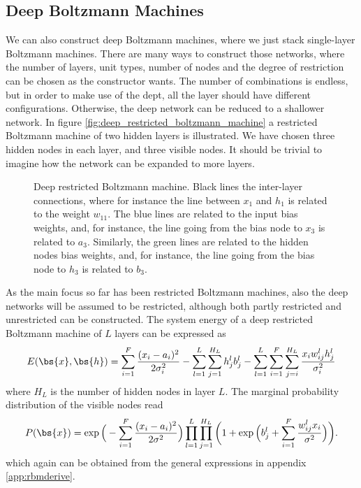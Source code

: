 \subsection{Deep Boltzmann Machines}
We can also construct deep Boltzmann machines, where we just stack single-layer Boltzmann machines. There are many ways to construct those networks, where the number of layers, unit types, number of nodes and the degree of restriction can be chosen as the constructor wants. The number of combinations is endless, but in order to make use of the dept, all the layer should have different configurations. Otherwise, the deep network can be reduced to a shallower network. In figure \eqref{fig:deep_restricted_boltzmann_machine} a restricted Boltzmann machine of two hidden layers is illustrated. We have chosen three hidden nodes in each layer, and three visible nodes. It should be trivial to imagine how the network can be expanded to more layers. 
\begin{figure} [H]
	\centering
	
	\caption{Deep restricted Boltzmann machine. Black lines the inter-layer connections, where for instance the line between $x_1$ and $h_1$ is related to the weight $w_{11}$. The blue lines are related to the input bias weights, and, for instance, the line going from the bias node to $x_3$ is related to $a_3$. Similarly, the green lines are related to the hidden nodes bias weights, and, for instance, the line going from the bias node to $h_3$ is related to $b_3$.}
	\label{fig:deep_restricted_boltzmann_machine}
\end{figure}

As the main focus so far has been restricted Boltzmann machines, also the deep networks will be assumed to be restricted, although both partly restricted and unrestricted can be constructed. The system energy of a deep restricted Boltzmann machine of $L$ layers can be expressed as
\begin{equation}
E(\bs{x},\bs{h})= \sum_{i=1}^F\frac{(x_i-a_i)^2}{2\sigma_i^2} - \sum_{l=1}^L\sum_{j=1}^{H_L}h_j^lb_j^l-\sum_{l=1}^L\sum_{i=1}^F\sum_{j=i}^{H_L} \frac{x_iw_{ij}^lh_j^l}{\sigma_i^2}
\label{eq:deepgaussianbinary}
\end{equation}
where $H_L$ is the number of hidden nodes in layer $L$. The marginal probability distribution of the visible nodes read
\begin{equation}
P(\bs{x})=\exp\Big(-\sum_{i=1}^F\frac{(x_i-a_i)^2}{2\sigma^2}\Big)\prod_{l=1}^L\prod_{j=1}^{H_L}\bigg(1+\exp\Big(b_j^l+\sum_{i=1}^F\frac{w_{ij}^lx_i}{\sigma^2}\Big)\bigg).
\label{eq:DRBMWF}
\end{equation}
which again can be obtained from the general expressions in appendix \ref{app:rbmderive}.